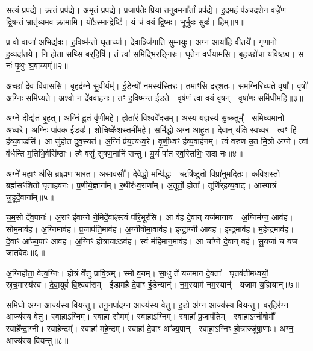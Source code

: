 स॒त्यं प्रप॑द्ये।
ऋ॒तं प्रप॑द्ये।
अ॒मृतं॒ प्रप॑द्ये।
प्र॒जा\-प॑तेः प्रि॒यां त॒नुव॒मना᳚र्तां॒ प्रप॑द्ये।
इ॒दम॒हं प॑ञ्चद॒शेन॒ वज्रे॑ण।
द्वि॒षन्तं॒ भ्रातृ॑व्य॒मव॑ क्रामामि।
यो᳚ऽस्मान्द्वेष्टि॑।
यं च॑ व॒यं द्वि॒ष्मः।
भूर्भुवः॒ सुवः॑।
हिम्॥१॥\anuvakamend[स॒त्यं दश॑]

प्र वो॒ वाजा॑ अ॒भिद्य॑वः।
ह॒विष्म॑न्तो घृ॒ताच्या᳚।
दे॒वाञ्जि॑गाति सुम्न॒युः।
अग्न॒ आया॑हि वी॒तये᳚।
गृ॒णा॒नो ह॒व्यदा॑तये।
नि होता॑ सथ्सि ब॒र्॒हिषि॑।
तं त्वा॑ स॒मिद्भि॑रङ्गिरः।
घृ॒तेन॑ वर्धयामसि।
बृ॒हच्छो॑चा यविष्ठ्य।
स नः॑ पृ॒थुः श्र॒वाय्यम्᳚॥२॥

अच्छा॑ देव विवाससि।
बृ॒हद॑ग्ने सु॒वीर्यम्᳚।
ई॒डेन्यो॑ नम॒स्य॑स्ति॒रः।
तमाꣳ॑सि दर्‌\mbox{}श॒तः।
सम॒ग्निरि॑ध्यते॒ वृषा᳚।
वृषो॑ अ॒ग्निः समि॑ध्यते।
अश्वो॒ न दे॑व॒वाह॑नः।
तꣳ ह॒विष्म॑न्त ईडते।
वृष॑णं त्वा व॒यं वृषन्॑।
वृषा॑णः॒ समि॑धीमहि॥३॥

अग्ने॒ दीद्य॑तं बृ॒हत्।
अ॒ग्निं दू॒तं वृ॑णीमहे।
होता॑रं वि॒श्ववे॑दसम्।
अ॒स्य य॒ज्ञस्य॑ सु॒क्रतुम्᳚।
स॒मि॒ध्यमा॑नो अध्व॒रे।
अ॒ग्निः पा॑व॒क ईड्यः॑।
शो॒चिष्के॑श॒स्तमी॑महे।
समि॑द्धो अग्न आहुत।
दे॒वान् य॑क्षि स्वध्वर।
त्वꣳ हि ह॑व्य॒वाडसि॑।
आ जु॑होत दुव॒स्यत॑।
अ॒ग्निं प्र॑य॒त्य॑ध्व॒रे।
वृ॒णी॒ध्वꣳ ह॑व्य॒वाह॑नम्।
त्वं वरु॑ण उ॒त मि॒त्रो अ॑ग्ने।
त्वां व॑र्धन्ति म॒तिभि॒र्वसि॑ष्ठाः।
त्वे वसु॑ सुषण॒नानि॑ सन्तु।
यू॒यं पा॑त स्व॒स्तिभिः॒ सदा॑ नः॥४॥\anuvakamend[श्र॒वाय्य॑मिधीम॒ह्यसि॑ स॒प्त च॑]

अग्ने॑ म॒हाꣳ अ॑सि ब्राह्मण भारत।
असा॒वसौ᳚।
दे॒वेद्धो॒ मन्वि॑द्धः।
ऋषि॑ष्टुतो॒ विप्रा॑नुमदितः।
क॒वि॒श॒स्तो ब्रह्म॑सꣳशितो घृ॒ताह॑वनः।
प्र॒णीर्य॒ज्ञाना᳚म्।
र॒थीर॑ध्व॒राणा᳚म्।
अ॒तूर्तो॒ होता᳚।
तूर्णि॑र्‌\mbox{}हव्य॒वाट्।
आस्पात्रं॑ जु॒हूर्दे॒वाना᳚म्॥५॥

च॒म॒सो दे॑व॒पानः॑।
अ॒राꣳ इ॑वाग्ने ने॒मिर्दे॒वाꣴस्त्वं प॑रि॒भूर॑सि।
आ व॑ह दे॒वान् यज॑मानाय।
अ॒ग्निम॑ग्न॒ आव॑ह।
सोम॒माव॑ह।
अ॒ग्निमाव॑ह।
प्र॒जा\-प॑ति॒माव॑ह।
अ॒ग्नीषोमा॒वाव॑ह।
इ॒न्द्रा॒ग्नी आव॑ह।
इन्द्र॒माव॑ह।
म॒हे॒न्द्रमाव॑ह।
दे॒वाꣳ आ᳚ज्य॒पाꣳ आव॑ह।
अ॒ग्निꣳ हो॒त्रायाऽऽव॑ह।
स्वं म॑हि॒मान॒माव॑ह।
आ चा᳚ग्ने दे॒वान् वह॑।
सु॒यजा॑ च यज जातवेदः॥६॥\anuvakamend[दे॒वाना॒मिन्द्र॒मा व॑ह॒ षट् च॑]

अ॒ग्निर्\mbox{}होता॒ वेत्व॒ग्निः।
हो॒त्रं वे᳚त्तु प्रावि॒त्रम्।
स्मो व॒यम्।
सा॒धु ते॑ यजमान दे॒वता᳚।
घृ॒तव॑तीमध्वर्यो॒ स्रुच॒मास्य॑स्व।
दे॒वा॒युवं॑ वि॒श्ववा॑राम्।
ईडा॑महै दे॒वाꣳ ई॒डेन्यान्॑।
न॒म॒स्याम॑ नम॒स्यान्॑।
यजा॑म य॒ज्ञियान्॑॥७॥\anuvakamend[अ॒ग्निर्‌\mbox{}होता॒ नव॑]

स॒मिधो॑ अग्न॒ आज्य॑स्य वियन्तु।
तनू॒नपा॑दग्न॒ आज्य॑स्य वेतु।
इ॒डो अ॑ग्न॒ आज्य॑स्य वियन्तु।
ब॒र्॒हिर॑ग्न॒ आज्य॑स्य वेतु।
स्वाहा॒\-ऽग्निम्।
स्वाहा॒ सोमम्᳚।
स्वाहा॒\-ऽग्निम्।
स्वाहा᳚ प्र॒जा\-प॑तिम्।
स्वाहा॒\-ऽग्नीषोमौ᳚।
स्वाहे᳚न्द्रा॒ग्नी।
स्वाहेन्द्रम्᳚।
स्वाहा॑ महे॒न्द्रम्।
स्वाहा॑ दे॒वाꣳ आ᳚ज्य॒पान्।
स्वाहा॒\-ऽग्निꣳ हो॒त्राज्जु॑षा॒णाः।
अग्न॒ आज्य॑स्य वियन्तु॥८॥\anuvakamend[इ॒न्द्रा॒ग्नी पञ्च॑ च]

